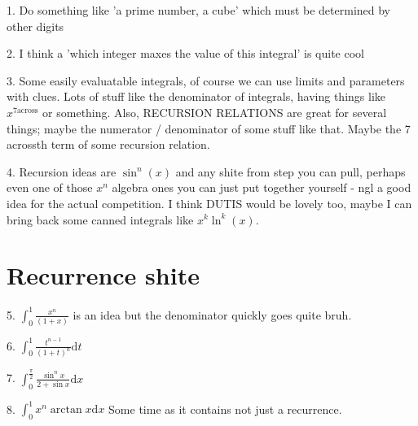 \documentclass{article}
\newcommand{\dd}{\mathrm{d}}
\begin{document}

1. Do something like 'a prime number, a cube' which must be determined by other digits

2. I think a 'which integer maxes the value of this integral' is quite cool

3. Some easily evaluatable integrals, of course we can use limits and parameters with clues. Lots of stuff like the denominator of integrals, having things like $x^{7 \text{across}}$ or something. Also, RECURSION RELATIONS are great for several things; maybe the numerator / denominator of some stuff like that. Maybe the 7 acrossth term of some recursion relation. 

4. Recursion ideas are $\sin^n(x)$ and any shite from step you can pull, perhaps even one of those $x^n$ algebra ones you can just put together yourself - ngl a good idea for the actual competition. I think DUTIS would be lovely too, maybe I can bring back some canned integrals like $x^k \ln^k(x)$. \newline \newline \newline

\section{Recurrence shite}

5. $\int_0^1 \frac{x^n}{(1+x)}$ is an idea but the denominator quickly goes quite bruh.

6. $\int_0^1 \frac{t^{n-1}}{(1+t)^n} \dd t$

7. $\int_0^{\frac{\pi}{2}} \frac{\sin^n{x}}{2+\sin{x}} \dd x$

8. $\int_0^1 x^n \arctan{x} \dd x$ Some time as it contains not just a recurrence.
\end{document}
